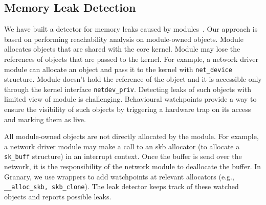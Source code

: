 \documentclass[letterpaper,twocolumn,10pt]{article}
\begin{document}




\subsection{Memory Leak Detection\label{sec:memory_leaks}}
We have built a detector for memory leaks caused by modules~\cite{Boehm96simplegarbage-collector-safety}. Our approach is based on performing reachability analysis on module-owned objects. %
Module allocates objects that are shared with the core kernel. Module may lose the references of objects that are passed to the kernel. For example, a network driver module can allocate an object and pass it to the kernel with \texttt{net\_device} structure. Module doesn't hold the reference of the object and it is accessible only through the kernel interface \texttt{netdev\_priv}. Detecting leaks of such objects with limited view of module is challenging. Behavioural watchpoints provide a way to ensure the visibility of such objects by triggering a hardware trap on its access and marking them as live.





All module-owned objects are not directly allocated by the module. For example, a network driver module may make a call to an skb allocator (to allocate a \texttt{sk\_buff} structure) in an interrupt context. Once the buffer is send over the network, it is the responsibility of the network module to deallocate the buffer. In Granary, we use wrappers to add watchpoints at relevant allocators (e.g., \texttt{\_\_alloc\_skb, skb\_clone}). The leak detector keeps track of these watched objects and reports possible leaks. 
\end{document}
